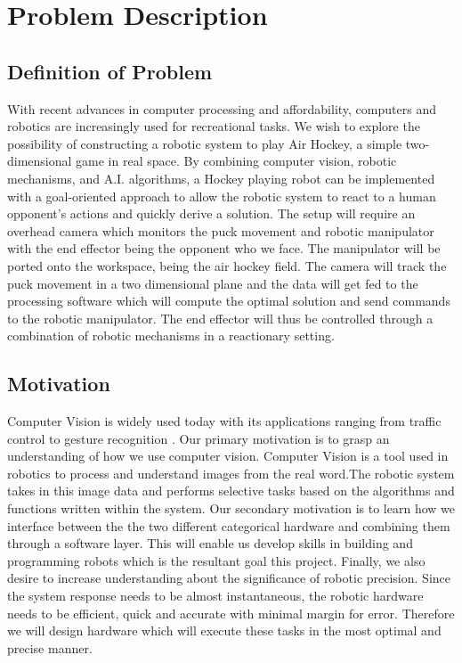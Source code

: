 \documentclass[letterpaper, 10 pt, conference]{ieeeconf}
\begin{document}
\section{Problem Description}
\label{sec:problem_description}
\subsection{Definition of Problem}
With recent advances in computer processing and affordability, computers and robotics are increasingly used for recreational tasks. We wish to explore the possibility of constructing a robotic system to play Air Hockey, a simple two-dimensional game in real space. By combining computer vision, robotic mechanisms, and A.I. algorithms, a Hockey playing robot can be implemented with a goal-oriented approach to allow the robotic system to react to a human opponent’s actions and quickly derive a solution. The setup will require an overhead camera which monitors the puck movement and robotic manipulator with the end effector being the opponent who we face. The manipulator will be ported onto the workspace, being the air hockey field. The camera will track the puck movement in a two dimensional plane and the data will get fed to the processing software which will compute the optimal solution and send commands to the robotic manipulator. The end effector will thus be controlled through a combination of robotic mechanisms in a reactionary setting.
\subsection{Motivation}
Computer Vision is widely used today with its applications ranging from traffic control\cite{aliane} to gesture recognition \cite{bhame}. Our primary motivation is to grasp an understanding of how we use computer vision. Computer Vision is a tool used in robotics to process and understand images from the real word.The robotic system takes in this image data and performs selective tasks based on the algorithms and functions written within the system. Our secondary motivation is to learn how we interface between the the two different categorical hardware and combining them through a software layer. This will enable us develop skills in building and programming robots which is the resultant goal this project. Finally, we also desire to increase understanding about the  significance of robotic precision. Since the system response needs to be almost instantaneous, the robotic hardware needs to be efficient, quick and accurate with minimal margin for error. Therefore we will design hardware which will execute these tasks in the most optimal and precise manner.
\end{document}
